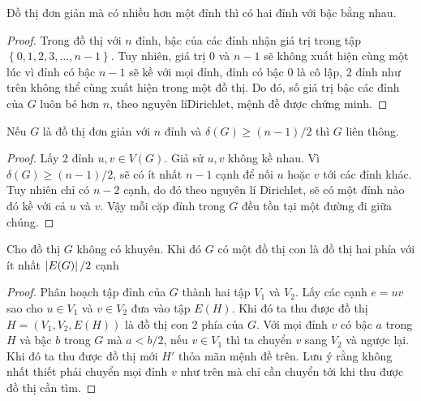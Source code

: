\begin{proposition}
	Đồ thị đơn giản mà có nhiều hơn một đỉnh thì có hai đỉnh với bậc bằng nhau.
	\begin{proof}
		Trong đồ thị với $n$ đỉnh, bậc của các đỉnh nhận giá trị trong tập $\left\{0,1,2,3,\ldots,n-1\right\}$. Tuy nhiên, giá trị $0$ và $n-1$ sẽ không xuất hiện cùng một lúc vì đỉnh có bậc $n-1$ sẽ kề với mọi đỉnh, đỉnh có bậc $0$ là cô lập, 2 đỉnh như trên không thể cùng xuất hiện trong một đồ thị. Do đó, số giá trị bậc các đỉnh của $G$ luôn bé hơn $n$, theo nguyên líDirichlet, mệnh đề được chứng minh.
	\end{proof}
\end{proposition}
\begin{proposition}
	Nếu $G$ là đồ thị đơn giản với $n$ đỉnh và $\delta(G) \ge (n-1)/2$ thì $G$ liên thông.
	\begin{proof}
		Lấy 2 đỉnh $u,v \in V(G)$. Giả sử $u,v$ không kề nhau. Vì $\delta(G) \ge (n-1)/2$, sẽ có ít nhất $n-1$ cạnh để nối $u$ hoặc $v$ tới các đỉnh khác. Tuy nhiên chỉ có $n-2$ cạnh, do đó theo nguyên lí Dirichlet, sẽ có một đỉnh nào đó kề với cả $u$ và $v$. Vậy mỗi cặp đỉnh trong $G$ đều tồn tại một đường đi giữa chúng.
	\end{proof}
\end{proposition}
\begin{theorem}
	\label{theo:sub_bigraph}
	Cho đồ thị $G$ không có khuyên. Khi đó $G$ có một đồ thị con là đồ thị hai phía với ít nhất $\left\lvert E(G)\right\rvert/2$ cạnh
	\begin{proof}
		Phân hoạch tập đỉnh của $G$ thành hai tập $V_1$ và $V_2$. Lấy các cạnh $e=uv$ sao cho $u \in V_1$ và $v\in V_2$ đưa vào tập $E(H)$. Khi đó ta thu được đồ thị $H = (V_1,V_2,E(H))$ là đồ thị con 2 phía của $G$. Với mọi đỉnh $v$ có bậc $a$ trong $H$ và bậc $b$ trong $G$ mà $a < b/2$, nếu $v \in V_1$ thì ta chuyển $v$ sang $V_2$ và ngược lại. Khi đó ta thu được đồ thị mới $H'$ thỏa mãn mệnh đề trên. Lưu ý rằng không nhất thiết phải chuyển mọi đỉnh $v$ như trên mà chỉ cần chuyển tới khi thu được đồ thị cần tìm.
	\end{proof}
\end{theorem}

